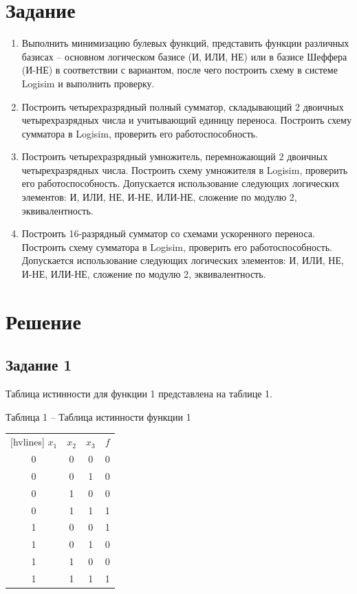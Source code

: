 \documentclass[a4paper,14pt]{extarticle}
\begin{document}
	\section*{Задание}
	\begin{enumerate}
		\item Выполнить минимизацию булевых функций, представить функции различных базисах – основном логическом базисе (И, ИЛИ, НЕ) или в базисе Шеффера (И-НЕ) в соответствии с вариантом, после чего построить схему в системе Logisim и выполнить проверку.
		
		\item Построить четырехразрядный полный сумматор, складывающий 2 двоичных четырехразрядных числа и учитывающий единицу переноса. Построить схему сумматора в Logisim, проверить его работоспособность.
		
		\item Построить четырехразрядный умножитель, перемножающий 2 двоичных четырехразрядных числа. Построить схему умножителя в Logisim, проверить его работоспособность.  Допускается использование следующих логических элементов: И, ИЛИ, НЕ, И-НЕ, ИЛИ-НЕ,  сложение по модулю 2, эквивалентность.
		
		\item Построить 16-разрядный сумматор со схемами ускоренного переноса.  Построить схему сумматора в Logisim, проверить его работоспособность.  Допускается использование следующих логических элементов: И, ИЛИ, НЕ, И-НЕ, ИЛИ-НЕ,  сложение по модулю 2, эквивалентность.
	\end{enumerate}
	
	\newpage
	\section*{Решение}
	\subsection*{Задание 1}
	Таблица истинности для функции 1 представлена на таблице 1.
	
	\noindent Таблица 1 -- Таблица истинности функции 1 \\
	\begin{NiceTabular}{cccc}[hvlines]
		$x_1$ & $x_2$ & $x_3$ & $f$ \\
		0 & 0 & 0 & 0 \\
		0 & 0 & 1 & 0 \\
		0 & 1 & 0 & 0 \\
		0 & 1 & 1 & 1 \\
		1 & 0 & 0 & 1 \\
		1 & 0 & 1 & 0 \\
		1 & 1 & 0 & 0 \\
		1 & 1 & 1 & 1
	\end{NiceTabular}\\
	
\end{document}
